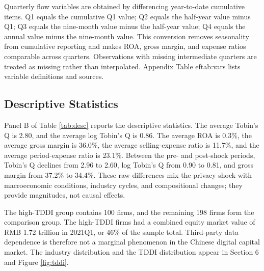 Quarterly flow variables are obtained by differencing year-to-date cumulative items. Q1 equals the cumulative Q1 value; Q2 equals the half-year value minus Q1; Q3 equals the nine-month value minus the half-year value; Q4 equals the annual value minus the nine-month value. This conversion removes seasonality from cumulative reporting and makes ROA, gross margin, and expense ratios comparable across quarters. Observations with missing intermediate quarters are treated as missing rather than interpolated. Appendix Table 
ef{tab:vars} lists variable definitions and sources.

\subsection{Descriptive Statistics}

Panel B of Table \ref{tab:desc} reports the descriptive statistics. The average Tobin's Q is 2.80, and the average log Tobin's Q is 0.86. The average ROA is 0.3\%, the average gross margin is 36.0\%, the average selling-expense ratio is 11.7\%, and the average period-expense ratio is 23.1\%. Between the pre- and post-shock periods, Tobin's Q declines from 2.96 to 2.60, log Tobin's Q from 0.90 to 0.81, and gross margin from 37.2\% to 34.4\%. These raw differences mix the privacy shock with macroeconomic conditions, industry cycles, and compositional changes; they provide magnitudes, not causal effects.

The high-TDDI group contains 100 firms, and the remaining 198 firms form the comparison group. The high-TDDI firms had a combined equity market value of RMB 1.72 trillion in 2021Q1, or 46\% of the sample total. Third-party data dependence is therefore not a marginal phenomenon in the Chinese digital capital market. The industry distribution and the TDDI distribution appear in Section 6 and Figure \ref{fig:tddi}.


